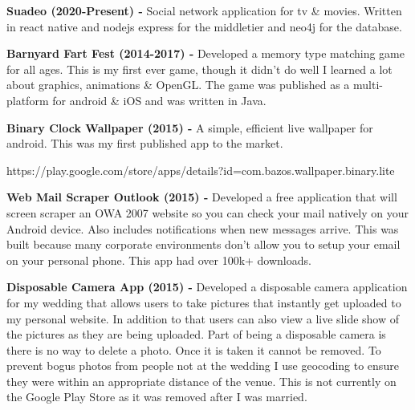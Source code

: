 \documentclass[a4paper,online]{adcv}
\begin{document}
\begin{adcvtabletwo}
  \textbf{Suadeo (2020-Present) - }
  Social network application for tv \& movies. Written in react native and nodejs express for the middletier and neo4j for the database.
  
  \adcvrowskip
  \adcvrowskip
  
  \textbf{Barnyard Fart Fest (2014-2017) - }
  Developed a memory type matching game for all ages. This is my first ever game, though it didn't do well I learned a lot about graphics, animations \& OpenGL. The game was published as a multi-platform for android & iOS and was written in Java.
  
  \adcvrowskip
  \adcvrowskip
  
  \textbf{Binary Clock Wallpaper (2015) - }
  A simple, efficient live wallpaper for android. This was my first published app to the market.
  
  https://play.google.com/store/apps/details?id=com.bazos.wallpaper.binary.lite
  
  \adcvrowskip
  \adcvrowskip
  
  \textbf{Web Mail Scraper Outlook (2015) - }
  Developed a free application that will screen scraper an OWA 2007 website so you can check your mail natively on your Android device. Also includes notifications when new messages arrive.  This was built because many corporate environments don’t allow you to setup your email on your personal phone. This app had over 100k+ downloads.
  
  \adcvrowskip
  \adcvrowskip
  \textbf{Disposable Camera App (2015) - }
  Developed a disposable camera application for my wedding that allows users to take pictures that instantly get uploaded to my personal website.  In addition to that users can also view a live slide show of the pictures as they are being uploaded.  Part of being a disposable camera is there is no way to delete a photo.  Once it is taken it cannot be removed.  To prevent bogus photos from people not at the wedding I use geocoding to ensure they were within an appropriate distance of the venue.  This is not currently on the Google Play Store as it was removed after I was married.
\end{adcvtabletwo}
\end{document}
